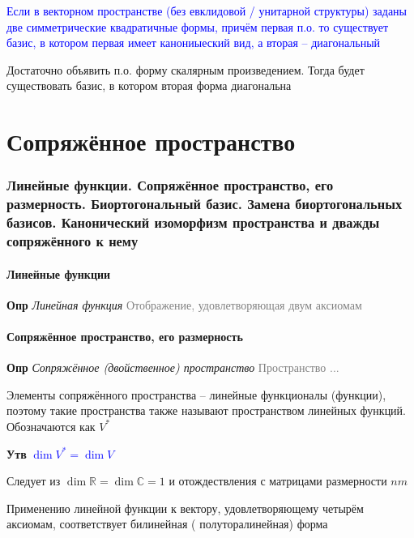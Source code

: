 \documentclass[a4paper, 14pt]{article}
\begin{document}
    \textcolor{blue}{Если в векторном пространстве (без евклидовой / унитарной структуры) заданы две симметрические
    квадратичные формы, причём первая п.о. то существует базис, в котором первая имеет канониыеский вид, а вторая --
    диагональный}
    
    Достаточно объявить п.о. форму скалярным произведением.
    Тогда будет существовать базис, в котором вторая форма диагональна
    
     \part*{Сопряжённое пространство}
    
    \section{Линейные функции.
    Сопряжённое пространство, его размерность.
    Биортогональный базис.
    Замена биортогональных базисов.
    Канонический изоморфизм пространства и дважды сопряжённого к нему}
    
    \subsection{Линейные функции}
    
    \textbf{Опр} \textit{Линейная функция} \textcolor{gray}{Отображение, удовлетворяющая двум аксиомам}
    
    \subsection{Сопряжённое пространство, его размерность}
    
    \textbf{Опр} \textit{Сопряжённое (двойственное) пространство} \textcolor{gray}{Пространство ...}
    
    Элементы сопряжённого пространства -- линейные функционалы (функции), поэтому такие пространства также называют
    пространством линейных функций.
    Обозначаются как $V^*$
    
    \textbf{Утв} \textcolor{blue}{$\dim V^* = \dim V$}
    
    Следует из $\dim \mathbb{R} = \dim \mathbb{C} = 1$ и отождествления с матрицами размерности $nm$
    
    Применению линейной функции к вектору, удовлетворяющему четырём аксиомам, соответствует билинейная (
    полуторалинейная) форма
    
\end{document}
